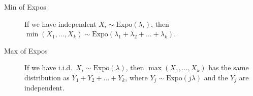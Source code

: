 \documentclass[6pt, landscape]{article}
\newcommand{\Expo}{\textrm{Expo}}
\begin{document}
\begin{multicols}{3}
\begin{description}

                \item[Min of Expos] If we have independent $X_i \sim \Expo(\lambda_i)$, then $\min(X_1, \dots, X_k) \sim \Expo(\lambda_1 + \lambda_2 + \dots + \lambda_k)$.
                \item[Max of Expos] If we have i.i.d.~$X_i \sim \Expo(\lambda)$, then $\max(X_1, \dots, X_k)$ has the same distribution as $Y_1+Y_2+\dots+Y_k$, where $Y_j \sim \Expo(j\lambda)$ and the $Y_j$ are independent.
        \end{description}


\end{multicols}
\end{document}
